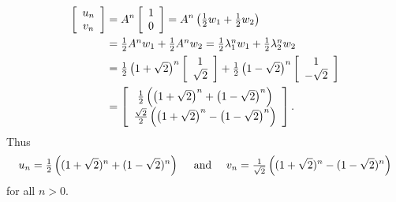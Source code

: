 \documentclass[a4paper]{amsart}
\renewenvironment{solution}{\SolutionInline}{\endSolutionInline}
\begin{document}
\begin{solution}
\begin{align*}
 \left[ \begin{array}{c}u_{n}\\ v_{n} \end{array} \right] &=
   A^{n} \left[ \begin{array}{c}1\\ 0 \end{array} \right] =
   A^{n}\left({\textstyle \tfrac{1}{2} w_1 + \tfrac{1}{2} w_2}\right) \\
  & = {\textstyle \tfrac{1}{2} A^nw_1 + \tfrac{1}{2} A^nw_2 } =
      {\textstyle \tfrac{1}{2}\lambda_1^nw_1 + \tfrac{1}{2}\lambda_2^nw_2 }\\
  & = {\textstyle \tfrac{1}{2}}\left(\textstyle 1+\sqrt{2}\right)^{n}
       \left[ \begin{array}{c}1 \\ \sqrt{2} \end{array} \right] +
      {\textstyle \tfrac{1}{2}}\left(\textstyle 1-\sqrt{2}\right)^{n}
       \left[ \begin{array}{c}1 \\ -\sqrt{2} \end{array} \right]
  \\& =
       \left[ \begin{array}{c} {\textstyle \tfrac{1}{2}}\left(\left(\textstyle 1+\sqrt{2}\right)^{n} + \left(\textstyle 1-\sqrt{2}\right)^{n}\right)  \\
       {\textstyle \frac{\sqrt{2}}{2}}\left(\left(\textstyle 1+\sqrt{2}\right)^{n} - \left(\textstyle 1-\sqrt{2}\right)^{n}\right)  \\
       \end{array} \right].
 \end{align*}
 Thus
 $$ u_n={\textstyle \tfrac{1}{2}}\left( (1+\sqrt{2})^n + (1-\sqrt{2})^n\right)
    \quad \text{~and~} \quad
    v_n={\textstyle \frac{1}{\sqrt{2}}}\left((1+\sqrt{2})^n-(1-\sqrt{2})^n\right)
 $$
 for all $n > 0$.
\end{solution}
\end{document}
